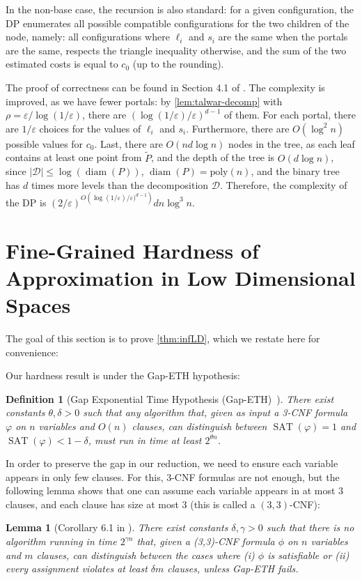 \documentclass[11pt]{article}
\newtheorem{lemma}[theorem]{Lemma}
\newtheorem{definition}[theorem]{Definition}
\newcommand{\eps}{\varepsilon}
\newcommand{\poly}{\mathrm{ poly}}
\renewcommand{\tilde}{\widetilde}
\DeclareMathOperator*{\sat}{SAT}
\newcommand{\calD}{\mathcal {D}}
\newcommand{\lpar}{\left(}
\newcommand{\rpar}{\right)}
\DeclareMathOperator{\diam}{diam}
\begin{document}
In the non-base case, the recursion is also standard: for a given configuration, 
the DP enumerates all possible compatible configurations for the two children of the node, namely: all configurations where $\ell_i$ and $s_i$ are the same when the portals are the same, respects the triangle inequality otherwise, and the sum of the two estimated costs is equal to $c_0$ (up to the rounding).

The proof of correctness can be found in Section 4.1 of \cite{jacm}. The complexity is improved, as we have fewer portals: by \cref{lem:talwar-decomp} with $\rho = \eps/\log(1/\eps)$, there are $(\log(1/\eps) / \eps)^{d-1}$ of them. For each portal, there are $1/\eps$ choices for the values of $\ell_i$ and $s_i$. Furthermore, there are $O(\log^2 n)$ possible values for $c_0$. 
Last, there are $O(nd \log n)$ nodes in the tree, as each leaf contains at least one point from $\tilde P$, and the depth of the tree is $O(d \log n)$, since $|\calD| \leq \log(\diam(P))$, $\diam(P) = \poly(n)$, and the binary tree has $d$ times more levels than the decomposition $\calD$. 
Therefore, the complexity of the DP is $(2/\eps)^{O\lpar \log(1/\eps)/\eps)^{d-1}\rpar} dn \log^3 n$. 

\section{Fine-Grained Hardness of Approximation in Low Dimensional Spaces}\label{sec:infLD}

The goal of this section is to prove \cref{thm:infLD}, which we restate here for convenience:
\infLD*

Our hardness result is under the Gap-ETH hypothesis:

\begin{definition}[Gap Exponential Time Hypothesis (Gap-ETH)~\cite{D16,MR16}] \label{hyp:gap-eth}
There exist constants $\theta,\delta> 0$ such that any algorithm that, given as input a 3-CNF formula $\varphi$ on $n$ variables and $O(n)$ clauses, can distinguish between $\sat(\varphi)=1$ and $\sat(\varphi)<1-\delta$, must run in time at least $2^{\theta n}$.
\end{definition}

In order to preserve the gap in our reduction, we need to ensure each variable appears in only few clauses. For this, 3-CNF formulas are not enough, but the following lemma shows that one can assume each variable appears in at most $3$ clauses, and each clause has size at most 3 (this is called a $(3, 3)$-CNF):
\begin{lemma}[Corollary 6.1 in \cite{Kisfaludi-BakNW21}]\label{lem:gap-eth}
    There exist constants $\delta, \gamma > 0$ such that there is no algorithm running in time $2^{\gamma n}$ that, given a
(3,3)-CNF formula $\phi$ on $n$ variables and $m$ clauses, can distinguish between the cases where (i) $\phi$
is satisfiable or (ii) every assignment violates at least $\delta m$ clauses, unless Gap-ETH fails.
\end{lemma}
\end{document}
